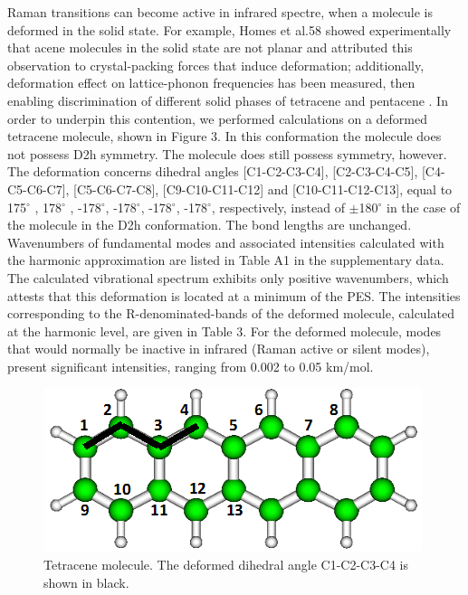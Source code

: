 Raman transitions can become active in infrared spectre, when a molecule is deformed in the solid state. For example, Homes et al.58 showed experimentally that acene molecules in the solid state are not planar and attributed this observation to crystal-packing forces that induce deformation; additionally, deformation effect on lattice-phonon frequencies has been measured, then enabling discrimination of different solid phases of tetracene \cite{venuti2004phonons} and pentacene \cite{venuti2002probing,brillante2002raman}. 
In order to underpin this contention, we performed calculations on a deformed tetracene molecule, shown in Figure 3. In this conformation the molecule does not possess D2h symmetry. The molecule does still possess symmetry, however. The deformation concerns dihedral angles [C1-C2-C3-C4], [C2-C3-C4-C5], [C4-C5-C6-C7], [C5-C6-C7-C8], [C9-C10-C11-C12] and [C10-C11-C12-C13], equal to 175$^{\circ}$ , 178$^{\circ}$ , -178$^{\circ}$, -178$^{\circ}$, -178$^{\circ}$, -178$^{\circ}$, respectively, instead of $\pm$180$^{\circ}$ in the case of the molecule in the D2h conformation. The bond lengths are unchanged. Wavenumbers of fundamental modes and associated intensities calculated with the harmonic approximation are listed in Table A1 in the supplementary data. The calculated vibrational spectrum exhibits only positive wavenumbers, which attests that this deformation is located at a minimum of the PES. The intensities corresponding to the R-denominated-bands of the deformed molecule, calculated at the harmonic level, are given in Table 3. For the deformed molecule, modes that would normally be inactive in infrared (Raman active or silent modes), present significant intensities, ranging from 0.002 to 0.05 km/mol.

\begin{figure}[h]
	\centering
	\includegraphics[scale=0.6]{image/Tetracene-def}
	\caption[The deformed dihedral angle C1-C2-C3-C4 in Tetracene molecule]{Tetracene molecule. The deformed dihedral angle C1-C2-C3-C4 is shown in black.}
\end{figure}

